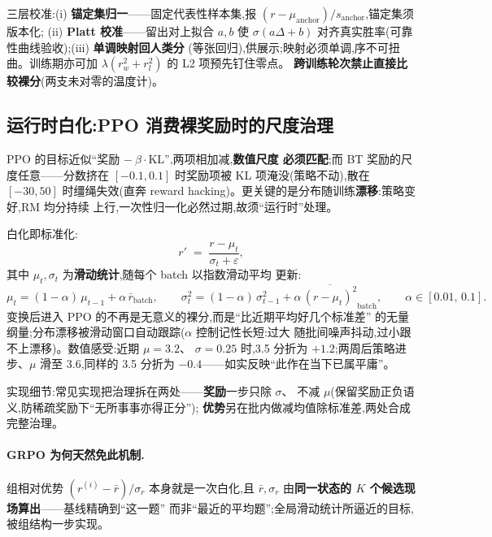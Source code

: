 \documentclass[UTF8, 11pt]{ctexart}
\begin{document}
三层校准:(i) \textbf{锚定集归一}——固定代表性样本集,报
$(r-\mu_{\text{anchor}})/s_{\text{anchor}}$,锚定集须版本化;
(ii) \textbf{Platt 校准}——留出对上拟合 $a,b$ 使 $\sigma(a\Delta+b)$
对齐真实胜率(可靠性曲线验收);(iii) \textbf{单调映射回人类分}
(等张回归),供展示;映射必须单调,序不可扭曲。训练期亦可加
$\lambda(r_w^2+r_l^2)$ 的 L2 项预先钉住零点。
\textbf{跨训练轮次禁止直接比较裸分}(两支未对零的温度计)。

\subsection{运行时白化:PPO 消费裸奖励时的尺度治理}

PPO 的目标近似``奖励 $-\ \beta\cdot$KL'',两项相加减,\textbf{数值尺度
必须匹配};而 BT 奖励的尺度任意——分数挤在 $[-0.1,0.1]$ 时奖励项被
KL 项淹没(策略不动),散在 $[-30,50]$ 时缰绳失效(直奔 reward
hacking)。更关键的是分布随训练\textbf{漂移}:策略变好,RM 均分持续
上行,一次性归一化必然过期,故须``运行时''处理。

白化即标准化:
\begin{equation}
r' \;=\; \frac{r-\mu_t}{\sigma_t+\varepsilon},
\label{eq:whiten}
\end{equation}
其中 $\mu_t,\sigma_t$ 为\textbf{滑动统计},随每个 batch 以指数滑动平均
更新:
\begin{equation}
\mu_t=(1-\alpha)\,\mu_{t-1}+\alpha\,\bar r_{\text{batch}},
\qquad
\sigma^2_t=(1-\alpha)\,\sigma^2_{t-1}
+\alpha\,\overline{(r-\mu_t)^2}_{\text{batch}},
\qquad \alpha\in[0.01,\,0.1].
\label{eq:ema}
\end{equation}
变换后进入 PPO 的不再是无意义的裸分,而是``比近期平均好几个标准差''
的无量纲量;分布漂移被滑动窗口自动跟踪($\alpha$ 控制记性长短:过大
随批间噪声抖动,过小跟不上漂移)。数值感受:近期 $\mu{=}3.2$、
$\sigma{=}0.25$ 时,3.5 分折为 $+1.2$;两周后策略进步、$\mu$ 滑至
3.6,同样的 3.5 分折为 $-0.4$——如实反映``此作在当下已属平庸''。

实现细节:常见实现把治理拆在两处——\textbf{奖励}一步只除 $\sigma$、
不减 $\mu$(保留奖励正负语义,防稀疏奖励下``无所事事亦得正分'');
\textbf{优势}另在批内做减均值除标准差,两处合成完整治理。

\paragraph{GRPO 为何天然免此机制.} 组相对优势
$(r^{(i)}-\bar r)/\sigma_r$ 本身就是一次白化,且 $\bar r,\sigma_r$
由\textbf{同一状态的 $K$ 个候选现场算出}——基线精确到``这一题''
而非``最近的平均题'';全局滑动统计所逼近的目标,被组结构一步实现。
\end{document}
